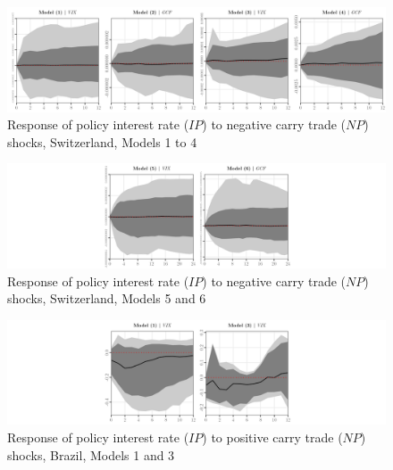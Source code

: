 \documentclass[a4paper, twoside]{templates/ociamthesis}
\begin{document}
\begin{figure}[!ht]

{\centering \includegraphics[width=0.99\columnwidth]{figure/g.MODEL1234.NPLOWER.FUND.IR.CH} 

}

\caption{Response of policy interest rate ($IP$) to negative carry trade ($NP$) shocks, Switzerland, Models 1 to 4}\label{fig:FigureIRCH1}
\end{figure}

\begin{figure}[!ht]

{\centering \includegraphics[width=0.99\columnwidth]{figure/g.MODEL56.NPLOWER.FUND.IR.CH} 

}

\caption{Response of policy interest rate ($IP$) to negative carry trade ($NP$) shocks, Switzerland, Models 5 and 6}\label{fig:FigureIRCH2}
\end{figure}

\begin{figure}[!ht]

{\centering \includegraphics[width=0.99\columnwidth]{figure/g.MODEL13.NPHIGHER.TARGET.IR.BR} 

}

\caption{Response of policy interest rate ($IP$) to positive carry trade ($NP$) shocks, Brazil, Models 1 and 3}\label{fig:FigureIRBR1}
\end{figure}
\end{document}
